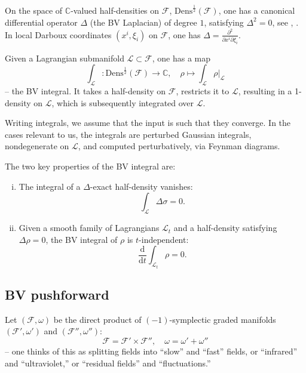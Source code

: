 \documentclass{amsart}
\theoremstyle{plain} %
\theoremstyle{definition}
\theoremstyle{remark}
\newcommand{\mr}{\mathrm}
\newcommand{\ra}{\rightarrow}
\newcommand{\F}{\mathcal{F}}
\newcommand{\LL}{\mathcal{L}}
\newcommand{\CC}{\mathbb{C}}
\newcommand{\HD}{\mathrm{Dens}^{\frac12}}
\newcommand{\ddd}{\mathrm{d}}
\begin{document}
On the space of $\CC$-valued half-densities on $\F$, $\mr{Dens}^{\frac12}(\F)$, one has a canonical differential operator $\Delta$ (the BV Laplacian) of degree $1$, satisfying $\Delta^2=0$, see \cite{Khudaverdian}, \cite{Severa}. In local Darboux coordinates $(x^i,\xi_i)$ on $\F$, one has $\Delta=\frac{\partial^2}{\partial x^i\partial \xi_i}$. 

Given a Lagrangian submanifold $\LL\subset \F$, one has a map
\begin{equation}\label{BV integral}
    \int_\LL\colon \HD(\F) \ra \mathbb{C},\quad \rho\mapsto \int_\LL \rho|_\LL
\end{equation}
-- the BV integral.
It takes a half-density on $\F$, restricts it to $\LL$, resulting in a 1-density on $\LL$, which is subsequently integrated over $\LL$.

Writing integrals, we assume that the input is such that they converge. In the cases relevant to us, the integrals are perturbed Gaussian integrals, nondegenerate on $\LL$, and computed perturbatively, via Feynman diagrams.

The two key properties of the BV integral are:
\begin{enumerate}[(i)]
    \item The integral of a $\Delta$-exact half-density vanishes: 
    \begin{equation}
    \int_\LL \Delta \sigma =0.
    \end{equation}
    \item Given a smooth family of Lagrangians $\LL_t$ and a half-density satisfying $\Delta \rho=0$, the BV integral of $\rho$ is $t$-independent:
    \begin{equation}
        \frac{\ddd}{\ddd t} \int_{\LL_t} \rho =0.
    \end{equation}
\end{enumerate}

\subsection{BV pushforward}\label{ss: BV pushforward}
Let $(\F,\omega)$ be the direct product of $(-1)$-symplectic graded manifolds $(\F',\omega')$ and $(\F'',\omega'')$:
\begin{equation}\label{F=F'xF'', omega=omega'+omega''}
    \F=\F'\times \F'',\quad \omega=\omega'+\omega''
\end{equation}
-- one thinks of this as splitting fields into ``slow'' and ``fast'' fields, or ``infrared'' and ``ultraviolet,'' or ``residual fields'' and ``fluctuations.'' %
\end{document}
